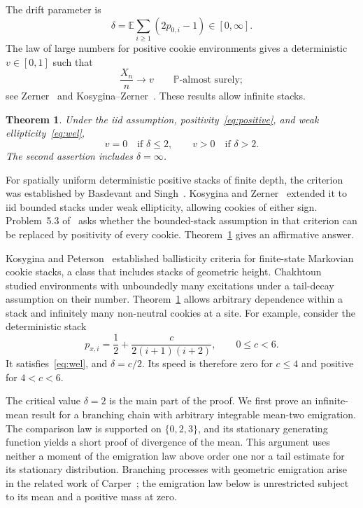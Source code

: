 \documentclass[11pt]{amsart}
\numberwithin{equation}{section}
\newtheorem{theorem}{Theorem}[section]
\theoremstyle{remark}
\newcommand{\E}{\mathbb E}
\newcommand{\Pp}{\mathbb P}
\begin{document}
The drift parameter is
\begin{equation}\label{eq:delta}
 \delta=\E\sum_{i\ge1}(2p_{0,i}-1)\in[0,\infty].
\end{equation}
The law of large numbers for positive cookie environments gives a deterministic $v\in[0,1]$ such that
\begin{equation}\label{eq:lln}
 \frac{X_n}{n}\longrightarrow v\qquad\Pp\text{-almost surely};
\end{equation}
see Zerner~\cite[Theorem~13]{Zerner05} and Kosygina--Zerner~\cite[Theorem~4.1]{KZ13}. These results allow infinite stacks.

\begin{theorem}\label{thm:main}
Under the iid assumption, positivity~\eqref{eq:positive}, and weak ellipticity~\eqref{eq:wel},
\[
 v=0\quad\text{if }\delta\le2,
 \qquad
 v>0\quad\text{if }\delta>2.
\]
The second assertion includes $\delta=\infty$.
\end{theorem}

For spatially uniform deterministic positive stacks of finite depth, the criterion was established by Basdevant and Singh~\cite{BS08}. Kosygina and Zerner~\cite[Theorem~2]{KZ08} extended it to iid bounded stacks under weak ellipticity, allowing cookies of either sign. Problem~5.3 of~\cite{KZ13} asks whether the bounded-stack assumption in that criterion can be replaced by positivity of every cookie. Theorem~\ref{thm:main} gives an affirmative answer.

Kosygina and Peterson~\cite{KP17} established ballisticity criteria for finite-state Markovian cookie stacks, a class that includes stacks of geometric height. Chakhtoun~\cite{Chakhtoun19} studied environments with unboundedly many excitations under a tail-decay assumption on their number. Theorem~\ref{thm:main} allows arbitrary dependence within a stack and infinitely many non-neutral cookies at a site. For example, consider the deterministic stack
\begin{equation}\label{eq:example}
 p_{x,i}=\frac12+\frac{c}{2(i+1)(i+2)},\qquad 0\le c<6.
\end{equation}
It satisfies~\eqref{eq:wel}, and $\delta=c/2$. Its speed is therefore zero for $c\le4$ and positive for $4<c<6$.

The critical value $\delta=2$ is the main part of the proof. We first prove an infinite-mean result for a branching chain with arbitrary integrable mean-two emigration. The comparison law is supported on $\{0,2,3\}$, and its stationary generating function yields a short proof of divergence of the mean. This argument uses neither a moment of the emigration law above order one nor a tail estimate for its stationary distribution. Branching processes with geometric emigration arise in the related work of Carper~\cite{Carper26}; the emigration law below is unrestricted subject to its mean and a positive mass at zero.
\end{document}
